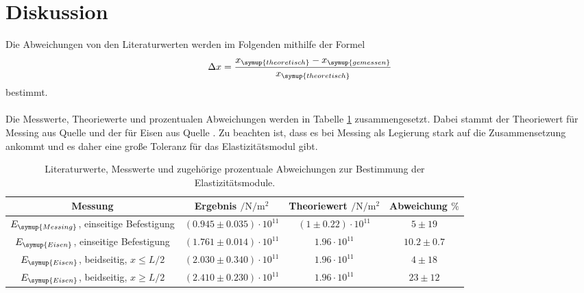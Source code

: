 \section{Diskussion}
\label{sec:Diskussion}

Die Abweichungen von den Literaturwerten werden im Folgenden mithilfe der Formel
\begin{equation*}
    \Delta x = \frac{x_{\symup{theoretisch}} - x_{\symup{gemessen}}}{x_{\symup{theoretisch}}}
\end{equation*}
bestimmt. \\
\\
\noindent Die Messwerte, Theoriewerte und prozentualen Abweichungen werden in Tabelle \ref{tab:vergleich}
zusammengesetzt. Dabei stammt der Theoriewert für Messing aus Quelle \cite{messing} und der für Eisen aus Quelle \cite{eisen}. Zu 
beachten ist, dass es bei Messing als Legierung stark auf die Zusammensetzung ankommt und es daher eine große 
Toleranz für das Elastizitätsmodul gibt.

\begin{table}
    \centering
    \caption{Literaturwerte, Messwerte und zugehörige prozentuale Abweichungen zur Bestimmung der Elastizitätsmodule.}
    \label{tab:vergleich}
    \begin{tabular}{c c c c}
        \toprule
        Messung & Ergebnis $\mathbin{/} \si{\newton\per\m\squared}$ & Theoriewert $\mathbin{/} \si{\newton\per\m\squared}$ & Abweichung $\%$\\
        \midrule
        $E_{\symup{Messing}}$, einseitige Befestigung & $\left( 0.945 \pm 0.035 \right)\cdot 10^{11}$ & $\left(1 \pm 0.22 \right) \cdot 10^{11}$ & $5 \pm 19$ \\
        $E_{\symup{Eisen}}$, einseitige Befestigung & $\left( 1.761 \pm 0.014\right)\cdot 10^{11}$ & $1.96 \cdot 10^{11} $ & $10.2 \pm 0.7$\\
        $E_{\symup{Eisen}}$, beidseitig, $x \leq L/2$ & $\left( 2.030 \pm 0.340 \right) \cdot 10^{11}$ & $1.96 \cdot 10^{11} $ & $4 \pm 18$ \\
        $E_{\symup{Eisen}}$, beidseitig, $x \geq L/2$ & $\left( 2.410 \pm 0.230 \right) \cdot 10^{11}$ &  $1.96 \cdot 10^{11} $ & $23 \pm 12$ \\
        \bottomrule
    \end{tabular}
\end{table}

